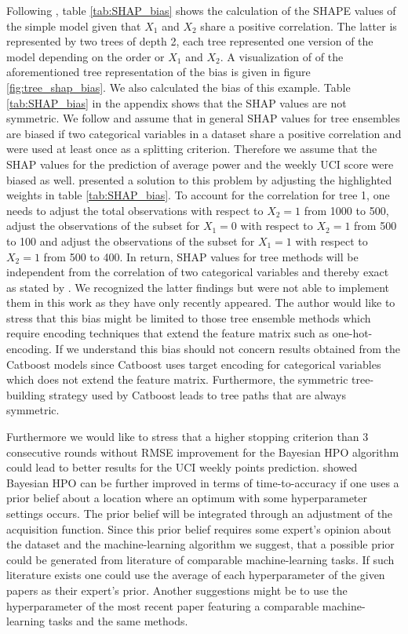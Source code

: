 \documentclass[12pt,a4paper]{article}
\begin{document}
Following \textcite{Amoukou2021}, table \ref{tab:SHAP_bias} shows the calculation of the SHAPE values of the simple model given that \(X_1\) and \(X_2\) share a positive correlation. The latter is represented by two trees of depth 2, each tree represented one version of the model depending on the order or \(X_1\) and \(X_2\). A visualization of of the aforementioned tree representation of the bias is given in figure \ref{fig:tree_shap_bias}. We also calculated the bias of this example. Table \ref{tab:SHAP_bias} in the appendix shows that the SHAP values are not symmetric. We follow \textcite{Amoukou2021} and assume that in general SHAP values for tree ensembles are biased if two categorical variables in a dataset share a positive correlation and were used at least once as a splitting criterion. Therefore we assume that the SHAP values for the prediction of average power and the weekly UCI score were biased as well. \textcite{Amoukou2021} presented a solution to this problem by adjusting the highlighted weights in table \ref{tab:SHAP_bias}. To account for the correlation for tree 1, one needs to adjust the total observations with respect to \(X_2=1\) from 1000 to 500, adjust the observations of the subset for \(X_1=0\) with respect to \(X_2=1\) from 500 to 100 and adjust the observations of the subset for \(X_1 =1\) with respect to \(X_2 = 1\) from 500 to 400. In return, SHAP values for tree methods will be independent from the correlation of two categorical variables and thereby exact as stated by \textcite{Lundberg2017}. We recognized the latter findings but were not able to implement them in this work as they have only recently appeared. The author would like to stress that this bias might be limited to those tree ensemble methods which require encoding techniques that extend the feature matrix such as one-hot-encoding. If we understand \textcite{Amoukou2021} this bias should not concern results obtained from the Catboost models since Catboost uses target encoding for categorical variables which does not extend the feature matrix. Furthermore, the symmetric tree-building strategy used by Catboost leads to tree paths that are always symmetric.

Furthermore we would like to stress that a higher stopping criterion than 3 consecutive rounds without RMSE improvement for the Bayesian HPO algorithm could lead to better results for the UCI weekly points prediction. \textcite{Hvarfner2022} showed Bayesian HPO can be further improved in terms of time-to-accuracy if one uses a prior belief about a location where an optimum with some hyperparameter settings occurs. The prior belief will be integrated through an adjustment of the acquisition function. Since this prior belief requires some expert's opinion about the dataset and the machine-learning algorithm we suggest, that a possible prior could be generated from literature of comparable machine-learning tasks. If such literature exists one could use the average of each hyperparameter of the given papers as their expert's prior. Another suggestions might be to use the hyperparameter of the most recent paper featuring a comparable machine-learning tasks and the same methods.
\end{document}

